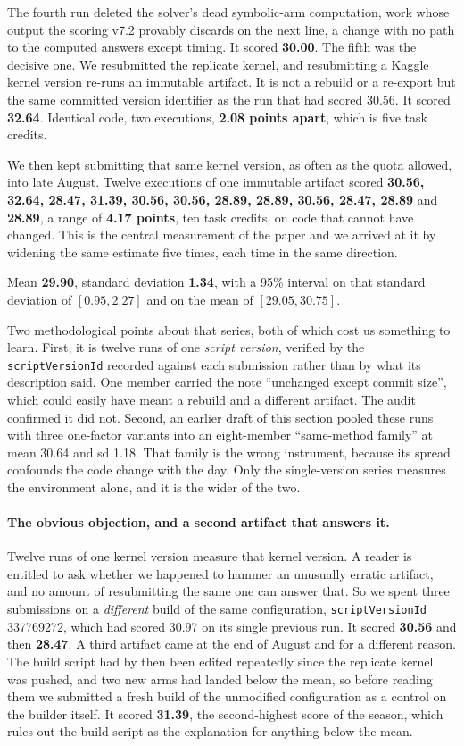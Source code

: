 \documentclass[11pt]{article}
\begin{document}
The fourth run deleted the solver's dead symbolic-arm computation, work whose output the scoring
v7.2 provably discards on the next line, a change with no path to the computed answers except
timing. It scored \textbf{30.00}. The fifth was the decisive one. We resubmitted the replicate
kernel, and resubmitting a Kaggle kernel version re-runs an immutable artifact. It is not a rebuild or a
re-export but the same committed version identifier as the run that had scored 30.56. It scored
\textbf{32.64}. Identical code, two executions, \textbf{2.08 points apart}, which is five task
credits.

We then kept submitting that same kernel version, as often as the quota allowed, into late August.
Twelve executions of one immutable artifact scored \textbf{30.56, 32.64, 28.47, 31.39, 30.56, 30.56,
28.89, 28.89, 30.56, 28.47, 28.89} and \textbf{28.89}, a range of \textbf{4.17 points}, ten task
credits, on code that cannot have changed. This is the central measurement of the paper and we arrived
at it by widening the same estimate five times, each time in the same direction.

Mean \textbf{29.90}, standard deviation \textbf{1.34}, with a 95\% interval on that standard
deviation of $[0.95, 2.27]$ and on the mean of $[29.05, 30.75]$.

Two methodological points about that series, both of which cost us something to learn. First, it is
twelve runs of one \emph{script version}, verified by the \texttt{scriptVersionId} recorded against
each submission rather than by what its description said. One member carried the note ``unchanged
except commit size'', which could easily have meant a rebuild and a different artifact. The audit
confirmed it did not. Second, an earlier draft of this section pooled these runs with three
one-factor variants into an eight-member ``same-method family'' at mean 30.64 and sd 1.18. That
family is the wrong instrument, because its spread confounds the code change with the day. Only the
single-version series measures the environment alone, and it is the wider of the two.

\paragraph{The obvious objection, and a second artifact that answers it.}
Twelve runs of one kernel version measure that kernel version. A reader is entitled to ask whether we
happened to hammer an unusually erratic artifact, and no amount of resubmitting the same one can
answer that. So we spent three submissions on a \emph{different} build of the same configuration,
\texttt{scriptVersionId} 337769272, which had scored 30.97 on its single previous run. It scored
\textbf{30.56} and then \textbf{28.47}. A third artifact came at the end of August and for a different
reason. The build script had by then been edited repeatedly since the replicate kernel was pushed, and
two new arms had landed below the mean, so before reading them we submitted a fresh build of the
unmodified configuration as a control on the builder itself. It scored \textbf{31.39}, the second-highest
score of the season, which rules out the build script as the explanation for anything below the mean.
\end{document}
